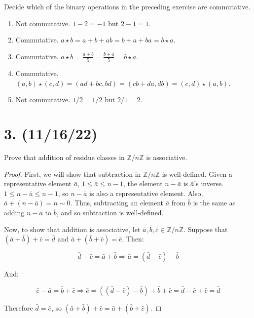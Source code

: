 \documentclass{article}
\begin{document}
Decide which of the binary operations in the preceding exercise are commutative.

\begin{enumerate}[label=(\alph*)]
    \item Not commutative. $1 - 2 = -1$ but $2 - 1 = 1$.
    \item Commutative. $a \star b = a + b + ab = b + a + ba = b \star a$.
    \item Commutative. $a \star b = \frac{a + b}{5} = \frac{b + a}{5} = b \star a$.
    \item Commutative. $(a,b)\star(c,d) = (ad + bc, bd) = (cb + da, db) = (c,d)\star(a,b)$.
    \item Not commutative. $1 / 2 = 1/2$ but $2 / 1 = 2$.
\end{enumerate}

\section*{3. (11/16/22)}

Prove that addition of residue classes in $\mathbb{Z}/n\mathbb{Z}$ is associative.

\begin{proof}

      First, we will show that subtraction in $\mathbb{Z}/n\mathbb{Z}$ is well-defined. Given a representative element $\bar{a}$, $1 \leq \bar{a} \leq n - 1$, the element $n - \bar{a}$ is $\bar{a}$'s inverse. $1 \leq n - \bar{a} \leq n - 1$, so $n - \bar{a}$ is also a representative element. Also, $\bar{a} + (n - \bar{a}) = n \sim 0$. Thus, subtracting an element $\bar{a}$ from $\bar{b}$ is the same as adding $n - \bar{a}$ to $\bar{b}$, and so subtraction is well-defined.

      Now, to show that addition is associative, let $\bar{a}, \bar{b}, \bar{c} \in \mathbb{Z}/n\mathbb{Z}$. Suppose that $(\bar{a} + \bar{b}) + \bar{c} = \bar{d}$ and $\bar{a} + (\bar{b} + \bar{c}) = \bar{e}$. Then:

      \begin{equation*}
            \bar{d} - \bar{c} = \bar{a} + \bar{b} \Rightarrow \bar{a} = (\bar{d} - \bar{c}) - \bar{b}
      \end{equation*}

      And:

      \begin{equation*}
            \bar{e} - \bar{a} = \bar{b} + \bar{c} \Rightarrow \bar{e} = ((\bar{d} - \bar{c}) - \bar{b}) + \bar{b} + \bar{c} = \bar{d} - \bar{c} + \bar{c} = \bar{d} 
      \end{equation*}

      Therefore $\bar{d} = \bar{e}$, so $(\bar{a} + \bar{b}) + \bar{c} = \bar{a} + (\bar{b} + \bar{c})$.
\end{proof}
\end{document}
